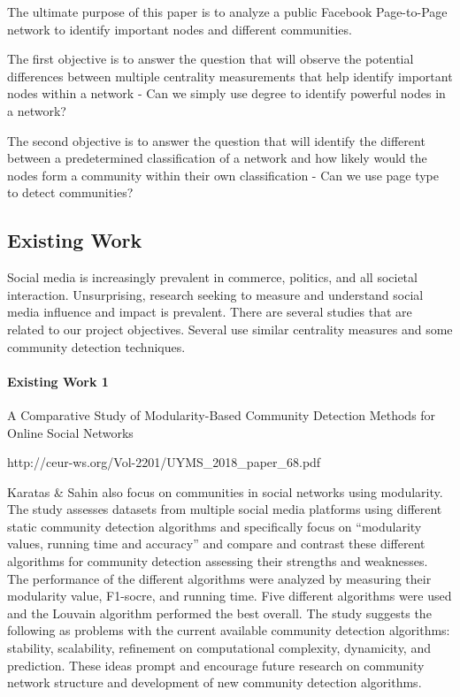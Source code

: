 \documentclass[11pt,twocolumn]{article}
\begin{document}
The ultimate purpose of this paper is to analyze a public Facebook Page-to-Page network to identify important nodes and different communities. 

The first objective is to answer the question that will observe the potential differences between multiple centrality measurements that help identify important nodes within a network - Can we simply use degree to identify powerful nodes in a network?


The second objective is to answer the question that will identify the different between a predetermined classification of a network and how likely would the nodes form a community within their own classification - Can we use page type to detect communities?




\subsection{Existing Work}

Social media is increasingly prevalent in commerce, politics, and all societal interaction. Unsurprising, research seeking to measure and understand social media influence and impact is prevalent. 
There are several studies that are related to our project objectives. Several use similar centrality measures and some community detection techniques. 


\paragraph{Existing Work 1 \cite{world-happiness-report-2018}} A Comparative Study of Modularity-Based Community Detection Methods for Online Social Networks 

http://ceur-ws.org/Vol-2201/UYMS_2018_paper_68.pdf	

Karatas & Sahin also focus on communities in social networks using modularity. The study assesses datasets from multiple social media platforms using different static community detection algorithms and specifically focus on “modularity values, running time and accuracy” and compare and contrast these different algorithms for community detection assessing their strengths and weaknesses. The performance of the different algorithms were analyzed by measuring their modularity value, F1-socre, and running time. Five different algorithms were used and the Louvain algorithm performed the best overall. The study suggests the following as problems with the current available community detection algorithms: stability, scalability, refinement on computational complexity, dynamicity, and prediction. These ideas prompt and encourage future research on community network structure and development of new community detection algorithms. 
   
\end{document}
